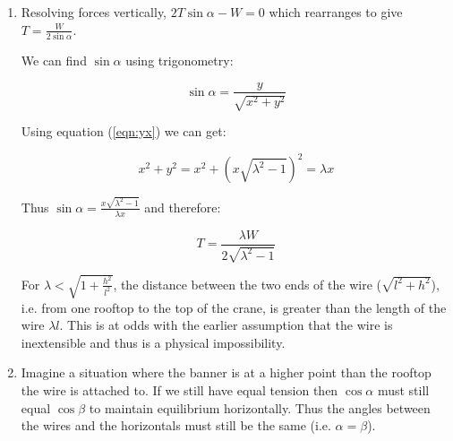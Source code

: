 \begin{problem}
{\begin{enumerate}
	   As $\lambda$ goes to $\sqrt{1 + \frac{h^2}{l^2}}$, $\sqrt{\lambda^2 -1}$ goes to $\frac{h}{l}$ and therefore $x$ and $y$ both go to zero. This equates to the banner sitting at the bottom end of the wire.
	   
	   As $\lambda$ goes to infinity,  $\sqrt{\lambda^2 -1}$ goes to $\lambda$ which is much greater than $h$, thus x goes to $\frac{l}{2}$, i.e. the banner sits half way between the buildings. At the same time $y$ goes to $\frac{\lambda l}{2}$, which means the banner hangs at half the height of the total length of wire. Both of these results correspond to the banner sitting directly in the middle of the wire.
	   
	   \item Resolving forces vertically, $2T\sin\alpha - W = 0$ which rearranges to give $T = \frac{W}{2\sin\alpha}$.
	   
	   We can find $\sin\alpha$ using trigonometry:
	   
	    \begin{equation*}	\sin\alpha = \frac{y}{\sqrt{x^2 + y^2}} \end{equation*}
	    
	    Using equation (\ref{eqn:yx}) we can get:
	    
	  \begin{equation*} x^2 + y^2 = x^2 + (x\sqrt{\lambda^2  -1})^2 = \lambda x \end{equation*}
	  
	  Thus $\sin\alpha = \frac{x\sqrt{\lambda^2  -1}}{\lambda x}$ and therefore:
	  
	  \begin{equation*} T = \frac{\lambda W}{2\sqrt{\lambda^2  -1}} \end{equation*}
	  
	  For $\lambda < \sqrt{1 + \frac{h^2}{l^2}}$, the distance between the two ends of the wire ($\sqrt{l^2 + h^2}$), i.e. from one rooftop to the top of the crane, is greater than the length of the wire $\lambda l$. This is at odds with the earlier assumption that the wire is inextensible and thus is a physical impossibility.
	  
	  \item Imagine a situation where the banner is at a higher point than the rooftop the wire is attached to. If we still have equal tension then $\cos\alpha$ must still equal $\cos\beta$ to maintain equilibrium horizontally. Thus the angles between the wires and the horizontals must still be the same (i.e. $\alpha = \beta$).
	  

\end{enumerate}}
\end{problem}
